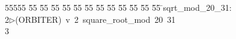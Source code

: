 %
%
\begin{tabbing}
55555 \= 55 \= 55 \= 55 \= 55 \= 55 \= 55 \= 55 \= 55 \= 55 \= 55 \= 55 \= 55 \= \>sqrt\_mod\_20\_31:\\[0pt]
2\>$\triangleright$\>(ORBITER)\ v\ 2\ square\_root\_mod\ 20\ 31\\[0pt]
3\>\end{tabbing}
